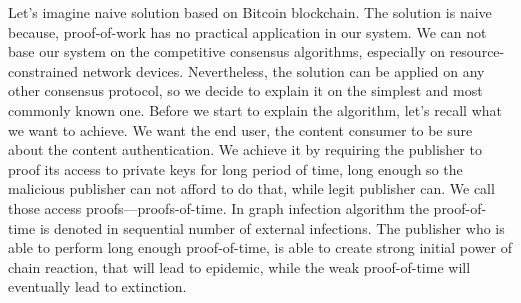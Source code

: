 \documentclass[nostrict]{szablonPG}
\begin{document}
Let's imagine naive solution based on Bitcoin blockchain. The solution is naive because, proof-of-work has no practical application in our system. We can not base our system on the competitive consensus algorithms, especially on resource-constrained network devices. Nevertheless, the solution can be applied on any other consensus protocol, so we decide to explain it on the simplest and most commonly known one. 
Before we start to explain the algorithm, let's recall what we want to achieve. We want the end user, the content consumer to be sure about the content authentication. We achieve it by requiring the publisher to proof its access to private keys for long period of time, long enough so the malicious publisher can not afford to do that, while legit publisher can. We call those access proofs––proofs-of-time. In graph infection algorithm the proof-of-time is denoted in sequential number of external infections. The publisher who is able to perform long enough proof-of-time, is able to create strong initial power of chain reaction, that will lead to epidemic, while the weak proof-of-time will eventually lead to extinction. 
\end{document}
